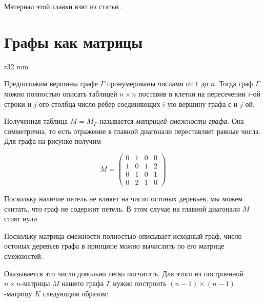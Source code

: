 \documentclass{article}
\begin{document}
Материал этой главки взят из статьи \cite{haghighi-bibak}.


\section{Графы как матрицы}

{

\begin{wrapfigure}{r}{32 mm}
\end{wrapfigure}

Предположим вершины графе $\Gamma$ пронумерованы числами от $1$ до $n$.
Тогда граф $\Gamma$ можно полностью описать таблицей $n\times n$ поставив в клетки на пересечении $i$-ой строки и $j$-ого столбца число рёбер соединяющих $i$-ую вершину графа с и $j$-ой.

}

Полученная таблица $M=M_\Gamma$ называется \emph{матрицей смежности графа}.
Она симметрична, то есть отражение в главной диагонали переставляет равные числа.
Для графа на рисунке получим 

\[M=\left(
\begin{matrix}
0&1&0&0
\\
1&0&1&2
\\
0&1&0&1
\\
0&2&1&0
\end{matrix}
\right)\]

Поскольку наличие петель не влияет на число остоных деревьев, мы можем считать, что граф не содержит петель.
В этом случае на главной диагонали $M$ стоят нули.

Поскольку матрица смежности полностью описывает исходный граф, 
число остоных деревьев графа в принципе можно вычислить по его матрице смежностей.

Оказывается это число довольно легко посчитать.
Для этого из построенной $n\times n$-матрицы  $M$ нашего графа $\Gamma$ нужно построить $(n-1)\times(n-1)$-матрицу $K$ следующим образом: 
\end{document}
